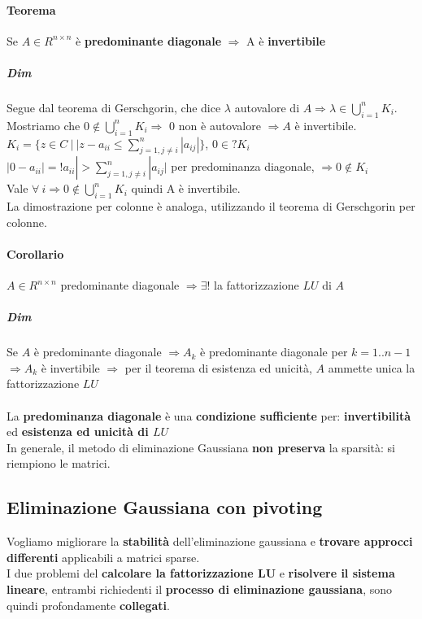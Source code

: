 \documentclass[10pt]{book}
\begin{document}
\paragraph{Teorema} Se $A \in R^{n \times n}$ è \textbf{predominante diagonale} $\Rightarrow$ A è \textbf{invertibile}
\subparagraph{Dim} Segue dal teorema di Gerschgorin, che dice $\lambda$ autovalore di $A \Rightarrow \lambda \in \bigcup_{i=1}^n K_i$.\\
Mostriamo che $0 \not\in \bigcup_{i=1}^n K_i \Rightarrow$ 0 non è autovalore $\Rightarrow A$ è invertibile.\\
$K_i = \{ z \in C\: |\: |z - a_{ii} \leq \sum_{j=1, j\neq i}^n |a_{ij}|\}$, $0 \in? K_i$\\
$|0 - a_{ii}| = !a_{ii}| > \sum_{j=1, j\neq i}^n |a_{ij}|$ per predominanza diagonale, $\Rightarrow 0 \not\in K_i$\\
Vale $\forall\: i \Rightarrow 0 \not\in \bigcup_{i=1}^n K_i$ quindi A è invertibile.\\
La dimostrazione per colonne è analoga, utilizzando il teorema di Gerschgorin per colonne.
\paragraph{Corollario} $A \in R^{n \times n}$ predominante diagonale $\Rightarrow \exists!$ la fattorizzazione $LU$ di $A$
\subparagraph{Dim} Se $A$ è predominante diagonale $\Rightarrow A_k$ è predominante diagonale per $k = 1 .. n-1$\\
$\Rightarrow A_k$ è invertibile $\Rightarrow$ per il teorema di esistenza ed unicità, $A$ ammette unica la fattorizzazione $LU$
\paragraph{} La \textbf{predominanza diagonale} è una \textbf{condizione sufficiente} per: \textbf{invertibilità} ed \textbf{esistenza ed unicità di $LU$}\\
In generale, il metodo di eliminazione Gaussiana \textbf{non preserva} la sparsità: si riempiono le matrici.
\subsection{Eliminazione Gaussiana con pivoting}
Vogliamo migliorare la \textbf{stabilità} dell'eliminazione gaussiana e \textbf{trovare approcci differenti} applicabili a matrici sparse.\\
I due problemi del \textbf{calcolare la fattorizzazione LU} e \textbf{risolvere il sistema lineare}, entrambi richiedenti il \textbf{processo di eliminazione gaussiana}, sono quindi profondamente \textbf{collegati}.
\end{document}
